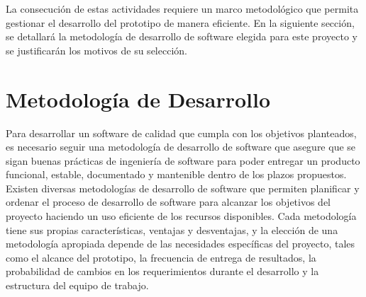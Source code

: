 La consecución de estas actividades requiere un marco metodológico que permita gestionar el desarrollo del prototipo de manera eficiente. En la siguiente sección, se detallará la metodología de desarrollo de software elegida para este proyecto y se justificarán los motivos de su selección.



\section{Metodología de Desarrollo}
\label{sec:software-method}

Para desarrollar un software de calidad que cumpla con los objetivos planteados, es necesario seguir una metodología de desarrollo de software que asegure que se sigan buenas prácticas de ingeniería de software para poder entregar un producto funcional, estable, documentado y mantenible dentro de los plazos propuestos. Existen diversas metodologías de desarrollo de software que permiten planificar y ordenar el proceso de desarrollo de software para alcanzar los objetivos del proyecto haciendo un uso eficiente de los recursos disponibles. Cada metodología tiene sus propias características, ventajas y desventajas, y la elección de una metodología apropiada depende de las necesidades específicas del proyecto, tales como el alcance del prototipo, la frecuencia de entrega de resultados, la probabilidad de cambios en los requerimientos durante el desarrollo y la estructura del equipo de trabajo.


